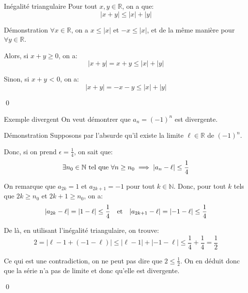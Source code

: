 \documentclass[a4paper]{article}
\begin{document}
\begin{parag}{Inégalité triangulaire}
    Pour tout $x, y \in \mathbb{R}$, on a que: 
    \[\left|x + y\right| \leq \left|x\right| + \left|y\right|\]
    
    \begin{subparag}{Démonstration}
        $\forall x \in \mathbb{R}$, on a $x \leq \left|x\right|$ et $-x \leq \left|x\right|$, et de la même manière pour $\forall y \in \mathbb{R}$. 

        Alors, si $x + y \geq 0$, on a: 
        \[\left|x + y\right| = x + y \leq \left|x\right| + \left|y\right|\]
        
        Sinon, si $x + y$ < 0, on a: 
        \[\left|x + y\right| = -x -y \leq \left|x\right| + \left|y\right|\]
        
        \qed
    \end{subparag}
    
\end{parag}

\begin{parag}{Exemple divergent}
    On veut démontrer que $a_n = \left(-1\right)^n$ est divergente.

    \begin{subparag}{Démonstration}
        Supposons par l'absurde qu'il existe la limite $\ell \in \mathbb{R}$ de $\left(-1\right)^n$. 

        Donc, si on prend $\epsilon = \frac{1}{4}$, on sait que: 
        \[\exists n_0 \in \mathbb{N} \telque \forall n \geq n_0 \implies \left|a_n - \ell\right| \leq \frac{1}{4}\]

        On remarque que $a_{2k} = 1$ et $a_{2k + 1} = -1$ pour tout $k \in \mathbb{N}$. Donc, pour tout $k$  tels que $2k \geq n_0$ et $2k + 1 \geq n_0$, on a: 
        \[\left|a_{2k} - \ell\right| = \left|1 - \ell\right| \leq \frac{1}{4} \mathspace \text{et} \mathspace \left|a_{2k + 1} - \ell\right| = \left|-1 - \ell\right| \leq \frac{1}{4}\]

        De là, en utilisant l'inégalité triangulaire, on trouve: 
        \[2 = \left|\ell - 1 + \left(-1 - \ell\right)\right| \leq \left|\ell - 1\right| + \left|-1 - \ell\right| \leq \frac{1}{4} + \frac{1}{4} = \frac{1}{2}\]
        
        Ce qui est une contradiction, on ne peut pas dire que $2 \leq \frac{1}{2}$. On en déduit donc que la série n'a pas de limite et donc qu'elle est divergente.

        \qed
    \end{subparag}
\end{parag}
\end{document}
